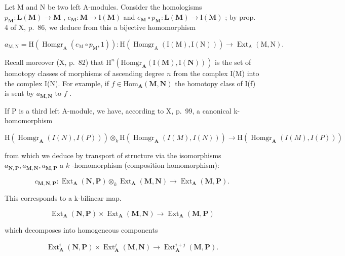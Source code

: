 Let M and N be two left A-modules. Consider the homologisms \(p_{\mathbf{M}}: \mathbf{L}(\mathbf{M}) \to \mathbf{M}\) , \(e_{\mathbf{M}}: \mathbf{M} \to \mathbf{l}(\mathbf{M})\) and \(e_{\mathbf{M}} \circ p_{\mathbf{M}}: \mathbf{L}(\mathbf{M}) \to \mathbf{l}(\mathbf{M})\) ; by prop. 4 of X, p.~86, we deduce from this a bijective homomorphism

\[
a _ {\mathrm{M}, \mathrm{N}} = \mathrm{H} (\operatorname{Homgr} _ {\mathrm{A}} (e _ {\mathrm{M}} \circ p _ {\mathrm{M}}, 1)): \mathrm{H} (\operatorname{Homgr} _ {\mathrm{A}} (\mathrm{I} (\mathrm{M}), \mathrm{I} (\mathrm{N}))) \rightarrow \operatorname{Ext} _ {\mathrm{A}} (\mathrm{M}, \mathrm{N}).
\]

Recall moreover (X, p.~82) that \(\mathrm{H}^n (\mathrm{Homgr}_{\mathbf{A}}(\mathrm{I}(\mathbf{M}),\mathrm{I}(\mathbf{N})))\) is the set of homotopy classes of morphisms of ascending degree \(n\) from the complex I(M) into the complex I(N). For example, if \(f\in \mathrm{Hom}_{\mathbf{A}}(\mathbf{M},\mathbf{N})\) the homotopy class of I(f) is sent by \(a_{\mathbf{M},\mathbf{N}}\) to \(f\) .

If P is a third left A-module, we have, according to X, p.~99, a canonical k-homomorphism

\[
\mathrm{H} (\operatorname{Homgr} _ {\mathbf {A}} (I (N), I (P))) \otimes_ {k} \mathrm{H} (\operatorname{Homgr} _ {\mathbf {A}} (I (M), I (N))) \rightarrow \mathrm{H} (\operatorname{Homgr} _ {\mathbf {A}} (I (M), I (P)))
\]

from which we deduce by transport of structure via the isomorphisms \(a_{\mathbf{N},\mathbf{P}}, a_{\mathbf{M},\mathbf{N}}, a_{\mathbf{M},\mathbf{P}}\) a \(k\) -homomorphism (composition homomorphism):

\[
c _ {\mathbf {M}, \mathbf {N}, \mathbf {P}}: \operatorname{Ext} _ {\mathbf {A}} (\mathbf {N}, \mathbf {P}) \otimes_ {k} \operatorname{Ext} _ {\mathbf {A}} (\mathbf {M}, \mathbf {N}) \rightarrow \operatorname{Ext} _ {\mathbf {A}} (\mathbf {M}, \mathbf {P}).
\]

This corresponds to a k-bilinear map.

\[
\operatorname{Ext} _ {\mathbf {A}} (\mathbf {N}, \mathbf {P}) \times \operatorname{Ext} _ {\mathbf {A}} (\mathbf {M}, \mathbf {N}) \rightarrow \operatorname{Ext} _ {\mathbf {A}} (\mathbf {M}, \mathbf {P})\tag{1}
\]

which decomposes into homogeneous components

\[
\operatorname{Ext} _ {\mathbf {A}} ^ {i} (\mathbf {N}, \mathbf {P}) \times \operatorname{Ext} _ {\mathbf {A}} ^ {j} (\mathbf {M}, \mathbf {N}) \rightarrow \operatorname{Ext} _ {\mathbf {A}} ^ {i + j} (\mathbf {M}, \mathbf {P}).\tag{2}
\]

